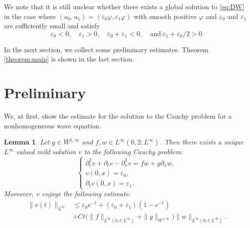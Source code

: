 \documentclass[reqno]{amsart}
\newtheorem{Lemma}[Theorem]{Lemma}
\begin{document}
We note that
it is still unclear whether
there exists a global solution to \eqref{eq:DW}
in the case where $(u_0,u_1) = (\varepsilon_0 \varphi, \varepsilon_1 \varphi)$
with smooth positive $\varphi$
and $\varepsilon_0$ and $\varepsilon_1$ are sufficiently small and satisfy
	\[
	\varepsilon_0 < 0,\quad
	\varepsilon_1 > 0,\quad
	\varepsilon_0 + \varepsilon_1 < 0,\quad
	\mbox{and} \
	\varepsilon_1 + \varepsilon_0/2 > 0.
	\]

In the next section, we collect some preliminary estimates.
Theorem \ref{theorem:main} is shown in the last section.

\section{Preliminary}

We, at first, show the estimate
for the solution to the Cauchy problem for a nonhomogeneous wave equation.

\begin{Lemma}\label{lemma:estimate_of_transformed_wave}
Let $g \in W^{1,\infty}$ and $f, w \in L^\infty(0,2;L^\infty)$.
Then there exists a unique $L^\infty$ valued mild solution $v$
to the following Cauchy problem:
	\[
	\begin{cases}
	\partial_t^2 v + \partial_t v - \partial_x^2 v  = f w+g \partial_x w,\\
	v(0,x)= \varepsilon_0,\\
	\partial_t v(0,x)= \varepsilon_1.
	\end{cases}
	\]
Moreover, $v$ enjoys the following estimate:
	\begin{align}
	\|v(t)\|_{L^\infty}
	& \leq \varepsilon_0 e^{-t} + (\varepsilon_0 + \varepsilon_1) (1-e^{-t})\\
	& + C t \bigg(
		\|f\|_{L^\infty(0,t; L^\infty)} + \| g \|_{W^{1,\infty}}
	\bigg) \|w\|_{L^\infty(0,t; L^\infty)}.
	\label{1dmax}
	\end{align}
\end{Lemma}
\end{document}

